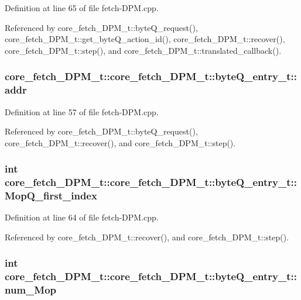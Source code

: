 Definition at line 65 of file fetch-DPM.cpp.

Referenced by core\_\-fetch\_\-DPM\_\-t::byteQ\_\-request(), core\_\-fetch\_\-DPM\_\-t::get\_\-byteQ\_\-action\_\-id(), core\_\-fetch\_\-DPM\_\-t::recover(), core\_\-fetch\_\-DPM\_\-t::step(), and core\_\-fetch\_\-DPM\_\-t::translated\_\-callback().
\subsubsection[{addr}]{ core\_\-fetch\_\-DPM\_\-t::core\_\-fetch\_\-DPM\_\-t::byteQ\_\-entry\_\-t::addr}\label{structcore__fetch__DPM__t_1_1byteQ__entry__t_06ecf36e0512a2da81337e36faac99e6}




Definition at line 57 of file fetch-DPM.cpp.

Referenced by core\_\-fetch\_\-DPM\_\-t::byteQ\_\-request(), core\_\-fetch\_\-DPM\_\-t::recover(), and core\_\-fetch\_\-DPM\_\-t::step().
\subsubsection[{MopQ\_\-first\_\-index}]{\setlength{\rightskip}{0pt plus 5cm}int core\_\-fetch\_\-DPM\_\-t::core\_\-fetch\_\-DPM\_\-t::byteQ\_\-entry\_\-t::MopQ\_\-first\_\-index}\label{structcore__fetch__DPM__t_1_1byteQ__entry__t_d35388854646a50796b1c4bb6beca51e}




Definition at line 64 of file fetch-DPM.cpp.

Referenced by core\_\-fetch\_\-DPM\_\-t::recover(), and core\_\-fetch\_\-DPM\_\-t::step().
\subsubsection[{num\_\-Mop}]{\setlength{\rightskip}{0pt plus 5cm}int core\_\-fetch\_\-DPM\_\-t::core\_\-fetch\_\-DPM\_\-t::byteQ\_\-entry\_\-t::num\_\-Mop}\label{structcore__fetch__DPM__t_1_1byteQ__entry__t_19fee45da466fa1ab7210e8f1a82af8c}




